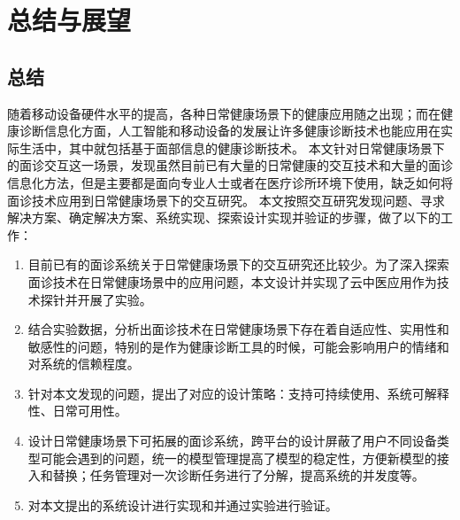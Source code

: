 \chapter{总结与展望}
\section{总结}
随着移动设备硬件水平的提高，各种日常健康场景下的健康应用随之出现；而在健康诊断信息化方面，人工智能和移动设备的发展让许多健康诊断技术也能应用在实际生活中，其中就包括基于面部信息的健康诊断技术。
本文针对日常健康场景下的面诊交互这一场景，发现虽然目前已有大量的日常健康的交互技术和大量的面诊信息化方法，但是主要都是面向专业人士或者在医疗诊所环境下使用，缺乏如何将面诊技术应用到日常健康场景下的交互研究。
本文按照交互研究发现问题、寻求解决方案、确定解决方案、系统实现、探索设计实现并验证的步骤，做了以下的工作：
\begin{enumerate}
	\item 目前已有的面诊系统关于日常健康场景下的交互研究还比较少。为了深入探索面诊技术在日常健康场景中的应用问题，本文设计并实现了云中医应用作为技术探针并开展了实验。
	
	\item 结合实验数据，分析出面诊技术在日常健康场景下存在着自适应性、实用性和敏感性的问题，特别的是作为健康诊断工具的时候，可能会影响用户的情绪和对系统的信赖程度。
	
	\item 针对本文发现的问题，提出了对应的设计策略：支持可持续使用、系统可解释性、日常可用性。

	\item 设计日常健康场景下可拓展的面诊系统，跨平台的设计屏蔽了用户不同设备类型可能会遇到的问题，统一的模型管理提高了模型的稳定性，方便新模型的接入和替换；任务管理对一次诊断任务进行了分解，提高系统的并发度等。

	\item 对本文提出的系统设计进行实现和并通过实验进行验证。
\end{enumerate}



